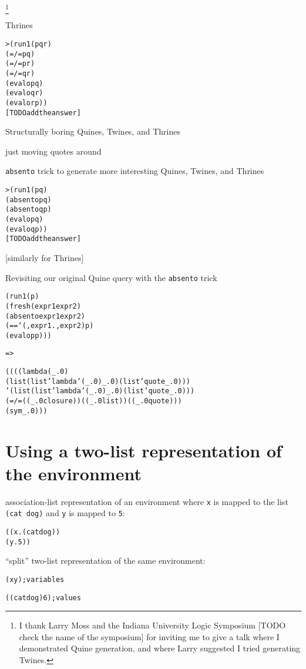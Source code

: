 \documentclass{book}
\begin{document}
\footnote{I thank Larry Moss and the Indiana University Logic Symposium [TODO check the name of the symposium] for inviting me to give a talk where I demonstrated Quine generation, and where Larry suggested I tried generating Twines.}

Thrines

\begin{alltt}
> (run 1 (p q r)
    (=/= p q)
    (=/= p r)
    (=/= q r)    
    (evalo p q)
    (evalo q r)
    (evalo r p))
[TODO add the answer]
\end{alltt}


Structurally boring Quines, Twines, and Thrines

just moving quotes around

\verb|absento| trick to generate more interesting Quines, Twines, and Thrines

\begin{alltt}
> (run 1 (p q)
    (absento p q)
    (absento q p)    
    (evalo p q)
    (evalo q p))
[TODO add the answer]
\end{alltt}

[similarly for Thrines]

Revisiting our original Quine query with the \verb|absento| trick

\begin{alltt}
(run 1 (p)
  (fresh (expr1 expr2)
    (absento expr1 expr2)
    (== `(,expr1 . ,expr2) p)
    (evalo p p)))
\end{alltt}
\verb|=>|
\begin{alltt}
((((lambda (_.0)
     (list (list 'lambda '(_.0) _.0) (list 'quote _.0)))
   '(list (list 'lambda '(_.0) _.0) (list 'quote _.0)))
  (=/= ((_.0 closure)) ((_.0 list)) ((_.0 quote)))
  (sym _.0)))
\end{alltt}


\chapter{Using a two-list representation of the environment}%

association-list representation of an environment where \verb|x| is mapped to the list \verb|(cat dog)| and \verb|y| is mapped to \verb|5|:
\begin{alltt}
((x . (cat dog))
 (y . 5))
\end{alltt}
  
``split'' two-list representation of the same environment:
\begin{alltt}
(x y) ; variables

((cat dog) 6) ; values
\end{alltt}
\end{document}

